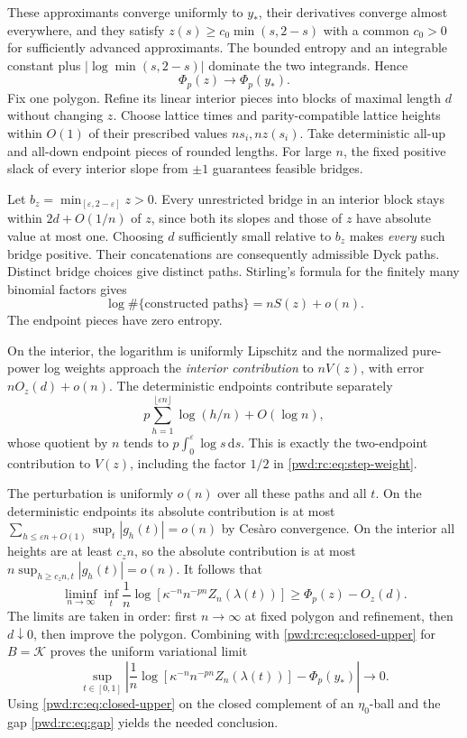 \documentclass[11pt,letterpaper]{article}
\numberwithin{equation}{section}
\theoremstyle{remark}\newtheorem{remark}[theorem]{Remark}
\newcommand{\K}{\mathcal K}\newcommand{\ee}{\mathrm e}\newcommand{\dd}{\,\mathrm d}
\begin{document}
These approximants converge uniformly to $y_*$, their derivatives converge almost everywhere, and they satisfy $z(s)\ge c_0\min(s,2-s)$ with a common $c_0>0$ for sufficiently advanced approximants. The bounded entropy and an integrable constant plus $|\log\min(s,2-s)|$ dominate the two integrands. Hence
\begin{equation}\label{pwd:rc:eq:polygon-approx}
 \Phi_p(z)\longrightarrow\Phi_p(y_*).
\end{equation}
Fix one polygon. Refine its linear interior pieces into blocks of maximal length $d$ without changing $z$. Choose lattice times and parity-compatible lattice heights within $O(1)$ of their prescribed values $ns_i,nz(s_i)$. Take deterministic all-up and all-down endpoint pieces of rounded lengths. For large $n$, the fixed positive slack of every interior slope from $\pm1$ guarantees feasible bridges.

Let $b_z=\min_{[\varepsilon,2-\varepsilon]}z>0$. Every unrestricted bridge in an interior block stays within $2d+O(1/n)$ of $z$, since both its slopes and those of $z$ have absolute value at most one. Choosing $d$ sufficiently small relative to $b_z$ makes \emph{every} such bridge positive. Their concatenations are consequently admissible Dyck paths. Distinct bridge choices give distinct paths. Stirling's formula for the finitely many binomial factors gives
\[
 \log\#\{\text{constructed paths}\}=nS(z)+o(n).
\]
The endpoint pieces have zero entropy.

On the interior, the logarithm is uniformly Lipschitz and the normalized pure-power log weights approach the \emph{interior contribution} to $nV(z)$, with error $nO_z(d)+o(n)$. The deterministic endpoints contribute separately
\begin{equation}\label{pwd:rc:eq:endpoint-potential}
 p\sum_{h=1}^{\lfloor\varepsilon n\rfloor}\log(h/n)+O(\log n),
\end{equation}
whose quotient by $n$ tends to $p\int_0^\varepsilon\log s\dd s$. This is exactly the two-endpoint contribution to $V(z)$, including the factor $1/2$ in \eqref{pwd:rc:eq:step-weight}.

The perturbation is uniformly $o(n)$ over all these paths and all $t$. On the deterministic endpoints its absolute contribution is at most
$\sum_{h\le\varepsilon n+O(1)}\sup_t|g_h(t)|=o(n)$ by Ces\`aro convergence. On the interior all heights are at least $c_zn$, so the absolute contribution is at most
$n\sup_{h\ge c_zn,t}|g_h(t)|=o(n)$. It follows that
\[
 \liminf_{n\to\infty}\inf_t\frac1n\log[\kappa^{-n}n^{-pn}Z_n(\lambda(t))]
 \ge\Phi_p(z)-O_z(d).
\]
The limits are taken in order: first $n\to\infty$ at fixed polygon and refinement, then $d\downarrow0$, then improve the polygon. Combining with \eqref{pwd:rc:eq:closed-upper} for $B=\K$ proves the uniform variational limit
\begin{equation}\label{pwd:rc:eq:free-energy}
 \sup_{t\in[0,1]}\left|\frac1n\log[\kappa^{-n}n^{-pn}Z_n(\lambda(t))]-\Phi_p(y_*)\right|
 \longrightarrow0.
\end{equation}
Using \eqref{pwd:rc:eq:closed-upper} on the closed complement of an $\eta_0$-ball and the gap \eqref{pwd:rc:eq:gap} yields the needed conclusion.
\end{document}

